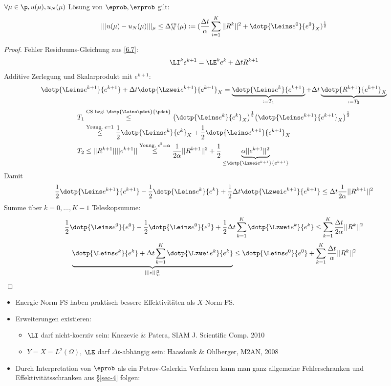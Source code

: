\begin{satz}
$\forall \mu \in \p, u(\mu), u_N(\mu)$ Lösung von $\eprob, \erprob$ gilt:
\[
	|||u(\mu) - u_N(\mu)|||_{\mu} \leq \Delta_N^{en}(\mu) := (\frac{\Delta t}{\alpha} \sum\limits_{i=1}^K ||R^k||^2 + \dotp{\Leins e^0}{e^0}_X)^{\frac{1}{2}}
\]
\begin{proof}
Fehler Residuums-Gleichung aus \ref{6.7}:
\[
	\LI^k e^{k+1} = \LE^k e^k + \Delta t R^{k+1}
\]
Additive Zerlegung und Skalarprodukt mit $e^{k+1}$:
\[
\dotp{\Leins e^{k+1}}{e^{k+1}} + \Delta t \dotp{\Lzwei e^{k+1}}{e^{k+1}}_X = \underbrace{\dotp{\Leins e^k}{e^{k+1}}}_{:= T_1} + \Delta t \underbrace{\dotp{R^{k+1}}{e^{k+1}}_X}_{:=T_2}
\]
\begin{align*}
T_1 &\overset{\text{CS bzgl } \dotp{\Leins \pdot}{\pdot}}{\leq} \big(\dotp{\Leins e^k}{e^k}_X \big)^{\frac{1}{2}} \big(\dotp{\Leins e^{k+1}}{e^{k+1}}_X \big)^{\frac{1}{2}} \\
&\overset{\text{Young, } \epsilon=1}{\leq} \frac{1}{2} \dotp{\Leins e^k}{e^k}_X + \frac{1}{2} \dotp{\Leins e^{k+1}}{e^{k+1}}_X \\
T_2 &\leq ||R^{k+1}|| ||e^{k+1}|| \overset{\text{Young, } \epsilon^2 = \alpha}{\leq} \frac{1}{2 \alpha} ||R^{k+1}||^2 + \frac{1}{2} \underbrace{\alpha ||e^{k+1}||^2}_{\leq \dotp{\Lzwei e^{k+1}}{e^{k+1}}}
\end{align*}
Damit
\[
	\frac{1}{2} \dotp{\Leins e^{k+1}}{e^{k+1}} - \frac{1}{2} \dotp{\Leins e^{k}}{e^{k}} + \frac{1}{2} \Delta t \dotp{\Lzwei e^{k+1}}{e^{k+1}} \leq \Delta t \frac{1}{2 \alpha} ||R^{k+1}||^2
\]
Summe über $k=0,\dots,K-1$ Teleskopsumme:
\[
	\frac{1}{2} \dotp{\Leins e^{0}}{e^{0}} - \frac{1}{2} \dotp{\Leins e^{0}}{e^{0}} + \frac{1}{2} \Delta t \sum\limits_{k=1}^K \dotp{\Lzwei e^{k}}{e^{k}} \leq \sum\limits_{k=1}^K \frac{\Delta t}{2 \alpha} ||R^{k}||^2
\]
\[
	\underbrace{\dotp{\Leins e^{k}}{e^{k}} + \Delta t \sum\limits_{k=1}^K \dotp{\Lzwei e^{k}}{e^{k}}}_{|||e|||_{\mu}^2} \leq \dotp{\Leins e^{0}}{e^{0}} + \sum\limits_{k=1}^K \frac{\Delta t}{\alpha} ||R^{k}||^2
\]
\end{proof}
\end{satz}

\begin{bem} \beginwithlistbem
\begin{itemize}
	\item Energie-Norm FS haben praktisch bessere Effektivitäten als $X$-Norm-FS.
	\item Erweiterungen existieren:
	\begin{itemize}
		\item $\LI$ darf nicht-koerziv sein: Knezevic \& Patera, SIAM J. Scientific Comp. 2010
		\item $Y=X=L^2(\Omega)$, $\LE$ darf $\Delta t$-abhängig sein: Haasdonk \& Ohlberger, M2AN, 2008
	\end{itemize}
	\item Durch Interpretation von $\eprob$ als ein Petrov-Galerkin Verfahren kann man ganz allgemeine Fehlerschranken und Effektivitätsschranken aus §\ref{sec-4} folgen:
\end{itemize}
\end{bem}

